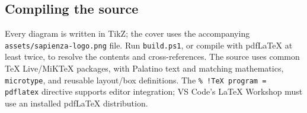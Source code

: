 \documentclass[11pt,a4paper]{article}
\numberwithin{equation}{section}
\numberwithin{figure}{section}
\numberwithin{table}{section}
\begin{document}
\subsection{Compiling the source}
Every diagram is written in TikZ; the cover uses the accompanying \texttt{assets/sapienza-logo.png} file. Run \texttt{build.ps1}, or compile with pdfLaTeX at least twice, to resolve the contents and cross-references. The source uses common TeX Live/MiKTeX packages, with Palatino text and matching mathematics, \texttt{microtype}, and reusable layout/box definitions. The \texttt{\% !TeX program = pdflatex} directive supports editor integration; VS Code's LaTeX Workshop must use an installed pdfLaTeX distribution.
\end{document}
